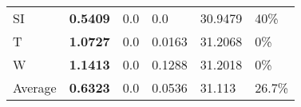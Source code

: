\documentclass[11pt, a4paper]{article}
\begin{document}
\begin{table}[H]
\begin{tabular}{llllll}
SI                        & \textbf{0.5409}                   & 0.0                               & 0.0                                  & 30.9479                            & 40\%                     \\
T                              & \textbf{1.0727}                   & 0.0                               & 0.0163                               & 31.2068                            & 0\%                      \\
W                             & \textbf{1.1413}                   & 0.0                               & 0.1288                               & 31.2018                            & 0\%                      \\ \hline
Average                               & \textbf{0.6323}                   & 0.0                               & 0.0536                               & 31.113                             & 26.7\%
\end{tabular}
\end{table}
\end{document}
